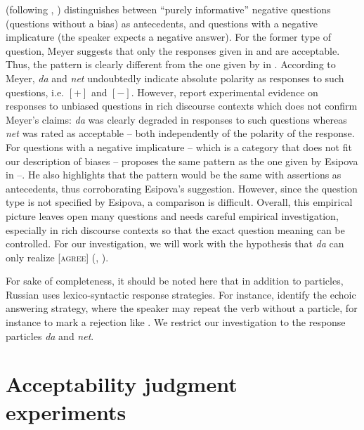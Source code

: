 \documentclass[output=paper,colorlinks,citecolor=brown]{langscibook}
\begin{document}
\noindent\citet{Meyer2004} (following \citealt{Restan1972}, \citealt{Brown.Franks1995}) distinguishes between “purely informative” negative questions (questions without a bias) as antecedents, and questions with a negative implicature (the speaker expects a negative answer). For the former type of question, Meyer suggests that only the responses given in  and  are acceptable. Thus, the pattern is clearly different from the one given by \citet{Esipova2021} in . According to Meyer, \textit{da} and \textit{net} undoubtedly indicate absolute polarity as responses to such questions, i.e. $[+]$ and $[-]$. However, \citet{ReppGeist2022} report experimental evidence on responses to unbiased questions in rich discourse contexts which does not confirm Meyer’s claims: \textit{da} was clearly degraded in responses to such questions whereas \textit{net} was rated as acceptable -- both independently of the polarity of the response. For questions with a negative implicature -- which is a category that does not fit our description of biases -- \citet{Meyer2004} proposes the same pattern as the one given by Esipova in --. He also highlights that the pattern would be the same with assertions as antecedents, thus corroborating Esipova’s suggestion. However, since the question type is not specified by Esipova, a comparison is difficult. Overall, this empirical picture leaves open many questions and needs careful empirical investigation, especially in rich discourse contexts so that the exact question meaning can be controlled. For our investigation, we will work with the hypothesis that \textit{da} can only realize [\textsc{agree}] (\citealt{Esipova2021}, \citealt{Gonzalez-FuenteTubauEspinalPrieto2015}).

For sake of completeness, it should be noted here that in addition to particles, Russian uses lexico-syntactic response strategies. For instance, \citet{Gonzalez-FuenteTubauEspinalPrieto2015} identify the echoic answering strategy, where the speaker may repeat the verb without a particle, for instance to mark a rejection like . We restrict our investigation to the response particles \textit{da} and \textit{net}.

\section{Acceptability judgment experiments}\label{geist-repp:sec:acceptability-judgment-experiments}
\end{document}
